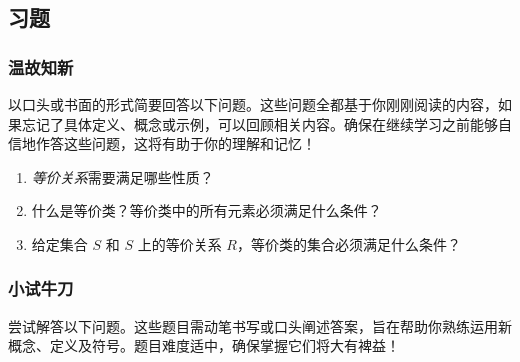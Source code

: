 
\subsection{习题}

\subsubsection*{温故知新}

以口头或书面的形式简要回答以下问题。这些问题全都基于你刚刚阅读的内容，如果忘记了具体定义、概念或示例，可以回顾相关内容。确保在继续学习之前能够自信地作答这些问题，这将有助于你的理解和记忆！

\begin{enumerate}[label=(\arabic*)]
    \item \emph{等价关系}需要满足哪些性质？
    \item 什么是等价类？等价类中的所有元素必须满足什么条件？
    \item 给定集合 $S$ 和 $S$ 上的等价关系 $R$，等价类的集合必须满足什么条件？
\end{enumerate}

\subsubsection*{小试牛刀}

尝试解答以下问题。这些题目需动笔书写或口头阐述答案，旨在帮助你熟练运用新概念、定义及符号。题目难度适中，确保掌握它们将大有裨益！

